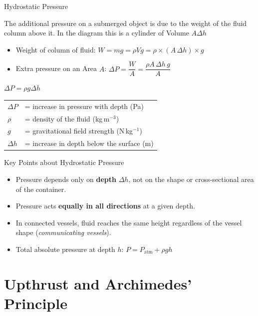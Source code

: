 \begin{formulabox}{Hydrostatic Pressure}

The additional pressure on a submerged object is due to the weight of the fluid column above it. In the diagram this is a cylinder of Volume $A\Delta h$

\begin{itemize}[itemsep=4pt]
  \item Weight of column of fluid: $W = mg = \rho V g = \rho \times (A\,\Delta h) \times g$
  \item Extra pressure on an Area $A$: $\Delta P = \dfrac{W}{A} = \dfrac{\rho A\,\Delta h\,g}{A}$
\end{itemize}

\begin{center}
\Large $\Delta P = \rho g \Delta h$
\end{center}
\vspace{0.3em}
\begin{tabular}{@{}ll@{}}
$\Delta P$  & = increase in pressure with depth (Pa) \\
$\rho$      & = density of the fluid (kg\,m$^{-3}$) \\
$g$         & = gravitational field strength (N\,kg$^{-1}$) \\
$\Delta h$  & = increase in depth below the surface (m) \\
\end{tabular}
\end{formulabox}

\begin{keybox}{Key Points about Hydrostatic Pressure}
\begin{itemize}[itemsep=2pt]
  \item Pressure depends only on \textbf{depth} $\Delta h$, not on the shape or cross-sectional area of the container.
  \item Pressure acts \textbf{equally in all directions} at a given depth.
  \item In connected vessels, fluid reaches the same height regardless of the vessel shape (\emph{communicating vessels}).
  \item Total absolute pressure at depth $h$: $P = P_\mathrm{atm} + \rho g h$ 
\end{itemize}
\end{keybox}


\pagebreak

\section{Upthrust and Archimedes' Principle}

